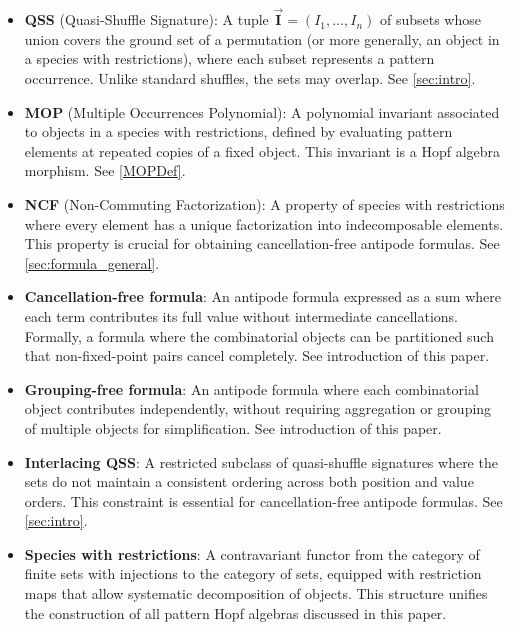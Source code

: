 \documentclass[12pt, reqno]{amsart}
\theoremstyle{definition}
\newcommand{\III}{\vec{\mathbf{I}}}
\begin{document}
\begin{itemize}

\item \textbf{QSS} (Quasi-Shuffle Signature): A tuple $\III = (I_1, \dots, I_n)$ of subsets whose union covers the ground set of a permutation (or more generally, an object in a species with restrictions), where each subset represents a pattern occurrence. Unlike standard shuffles, the sets may overlap. See \cref{sec:intro}.

\item \textbf{MOP} (Multiple Occurrences Polynomial): A polynomial invariant associated to objects in a species with restrictions, defined by evaluating pattern elements at repeated copies of a fixed object. This invariant is a Hopf algebra morphism. See \cref{MOPDef}.

\item \textbf{NCF} (Non-Commuting Factorization): A property of species with restrictions where every element has a unique factorization into indecomposable elements. This property is crucial for obtaining cancellation-free antipode formulas. See \cref{sec:formula_general}.

\item \textbf{Cancellation-free formula}: An antipode formula expressed as a sum where each term contributes its full value without intermediate cancellations. Formally, a formula where the combinatorial objects can be partitioned such that non-fixed-point pairs cancel completely. See introduction of this paper.

\item \textbf{Grouping-free formula}: An antipode formula where each combinatorial object contributes independently, without requiring aggregation or grouping of multiple objects for simplification. See introduction of this paper.

\item \textbf{Interlacing QSS}: A restricted subclass of quasi-shuffle signatures where the sets do not maintain a consistent ordering across both position and value orders. This constraint is essential for cancellation-free antipode formulas. See \cref{sec:intro}.

\item \textbf{Species with restrictions}: A contravariant functor from the category of finite sets with injections to the category of sets, equipped with restriction maps that allow systematic decomposition of objects. This structure unifies the construction of all pattern Hopf algebras discussed in this paper.


\end{itemize}
\end{document}
